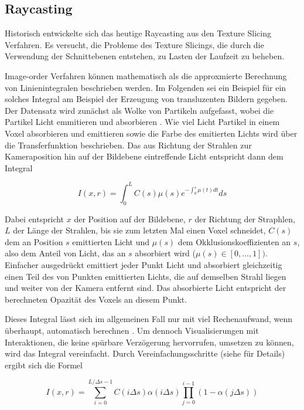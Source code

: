 \documentclass[a4paper,fontsize=12pt,toc=bib,halfparskip]{scrartcl}
\begin{document}
\subsection{Raycasting}
\label{sec:Raycasting}

Historisch entwickelte sich das heutige Raycasting aus den Texture Slicing Verfahren. Es versucht, die Probleme des Texture Slicings, die durch die Verwendung der Schnittebenen entstehen, zu Lasten der Laufzeit zu beheben.

Image-order Verfahren k\"onnen mathematisch als die approxmierte Berechnung von Linienintegralen beschrieben werden. Im Folgenden sei ein Beispiel f\"ur ein solches Integral am Beispiel der Erzeugung von transluzenten Bildern gegeben.
Der Datensatz wird zun\"achst als Wolke von Partikeln aufgefasst, wobei die Partikel Licht emmitieren und absorbieren \cite[s.~134f]{hansen2005visualization}. Wie viel Licht Partikel in einem Voxel absorbieren und emittieren sowie die Farbe des emitierten Lichts wird \"uber die Transferfunktion beschrieben. Das aus Richtung der Strahlen zur Kameraposition hin auf der Bildebene eintreffende Licht entspricht dann dem Integral 

\begin{equation}
I(x,r) = \int_{0}^{L} C(s)\mu(s) e^{-\int_{0}^{s}\mu(t)dt}ds
\end{equation}

Dabei entspricht $x$ der Position auf der Bildebene, $r$ der Richtung der Straphlen, $L$ der L\"ange der Strahlen, bis sie zum letzten Mal einen Voxel schneidet, $C(s)$ dem an Position $s$ emittierten Licht und $\mu(s)$ dem Okklusionskoeffizienten an $s$, also dem Anteil von Licht, das an $s$ absorbiert wird ($\mu(s) \in [0, \dots, 1])$. Einfacher ausgedr\"uckt emittiert jeder Punkt Licht und absorbiert gleichzeitig einen Teil des von Punkten emittierten Lichts, die auf demselben Strahl liegen und weiter von der Kamera entfernt sind. Das absorbierte Licht entspricht der berechneten Opazit\"at des Voxels an diesem Punkt.

Dieses Integral l\"asst sich im allgemeinen Fall nur mit viel Rechenaufwand, wenn \"uberhaupt, automatisch berechnen \cite[S.~136]{hansen2005visualization}. Um dennoch Visualisierungen mit Interaktionen, die keine sp\"urbare Verz\"ogerung hervorrufen, umsetzen zu k\"onnen, wird das Integral vereinfacht. Durch Vereinfachungsschritte (siehe \cite[S.~136]{hansen2005visualization} f\"ur Details) ergibt sich die Formel

\begin{equation}
I(x,r) = \sum_{i=0}^{L/\Delta s - 1} C(i\Delta s)\alpha(i\Delta s) \prod_{j=0}^{i-1}( 1 - \alpha(j \Delta s))
\end{equation}
\end{document}
